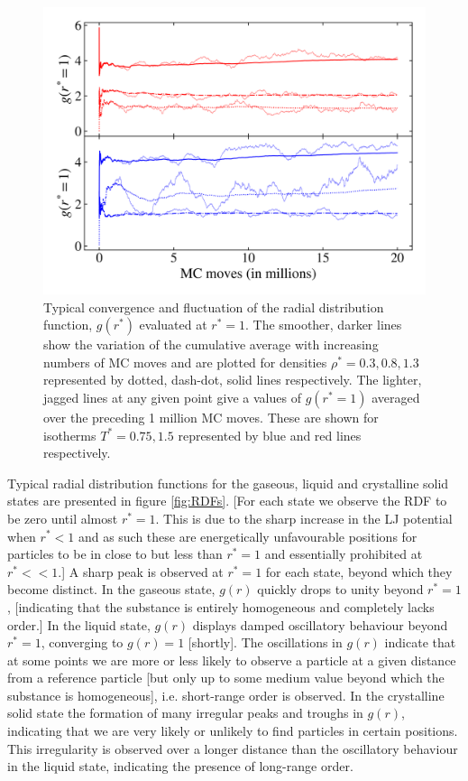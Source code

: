 \documentclass[10pt, twocolumn]{revtex4}    %
\begin{document}
\begin{figure}
	\includegraphics[width=\linewidth]{figures/convergence/gAtSigma_convergence.png}
	\caption{Typical convergence and fluctuation of the radial distribution function, $g(r^{*})$ evaluated at $r^{*}=1$. The smoother, darker lines show the variation of the cumulative average with increasing numbers of MC moves and are plotted for densities $\rho^{*} = 0.3, 0.8, 1.3$ represented by dotted, dash-dot, solid lines respectively. The lighter, jagged lines at any given point give a values of $g(r^{*}=1)$ averaged over the preceding 1 million MC moves. These are shown for isotherms $T^{*} = 0.75, 1.5$ represented by blue and red lines respectively. 
	}
	\label{fig:convergence}
\end{figure}

Typical radial distribution functions for the gaseous, liquid and crystalline solid states are presented in figure \ref{fig:RDFs}. [For each state we observe the RDF to be zero until almost $r^{*}=1$. This is due to the sharp increase in the LJ potential when $r^{*}<1$ and as such these are energetically unfavourable positions for particles to be in close to but less than $r^{*}=1$ and essentially prohibited at $r^{*}<<1$.] A sharp peak is observed at $r^{*}=1$ for each state, beyond which they become distinct. In the gaseous state, $g(r)$ quickly drops to unity beyond $r^{*}=1$, [indicating that the substance is entirely homogeneous and completely lacks order.] In the liquid state, $g(r)$ displays damped oscillatory behaviour beyond $r^{*}=1$, converging to $g(r)=1$ [shortly]. The oscillations in $g(r)$ indicate that at some points we are more or less likely to observe a particle at a given distance from a reference particle [but only up to some medium value beyond which the substance is homogeneous], i.e. short-range order is observed. In the crystalline solid state the formation of many irregular peaks and troughs in $g(r)$, indicating that we are very likely or unlikely to find particles in certain positions. This irregularity is observed over a longer distance than the oscillatory behaviour in the liquid state, indicating the presence of long-range order.
\end{document}
